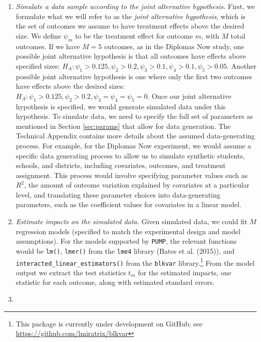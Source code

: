 \documentclass[
]{article}
\begin{document}
\begin{enumerate}
\def\labelenumi{\arabic{enumi}.}
\item
  \emph{Simulate a data sample according to the joint alternative
  hypothesis.} First, we formulate what we will refer to as the
  \emph{joint alternative hypothesis}, which is the set of outcomes we
  assume to have treatment effects above the desired size. We define
  \(\psi_m\) to be the treatment effect for outcome \(m\), with \(M\)
  total outcomes. If we have \(M = 5\) outcomes, as in the Diplomas Now
  study, one possible joint alternative hypothesis is that all outcomes
  have effects above specified sizes:
  \(H_A: \psi_1 > 0.125, \psi_2 > 0.2, \psi_3 > 0.1, \psi_4 > 0.1, \psi_5 > 0.05\).
  Another possible joint alternative hypothesis is one where only the
  first two outcomes have effects above the desired sizes:
  \(H_A: \psi_1 > 0.125, \psi_2 > 0.2, \psi_3 = \psi_4 = \psi_5 = 0\).
  Once our joint alternative hypothesis is specified, we would generate
  simulated data under this hypothesis. To simulate data, we need to
  specify the full set of parameters as mentioned in Section
  \ref{sec:params} that allow for data generation. The Technical
  Appendix contains more details about the assumed data-generating
  process. For example, for the Diplomas Now experiment, we would assume
  a specific data generating process to allow us to simulate synthetic
  students, schools, and districts, including covariates, outcomes, and
  treatment assignment. This process would involve specifying parameter
  values such as \(R^2\), the amount of outcome variation explained by
  covariates at a particular level, and translating these parameter
  choices into data-generating parameters, such as the coefficient
  values for covariates in a linear model.
\item
  \emph{Estimate impacts on the simulated data.} Given simulated data,
  we could fit \(M\) regression models (specified to match the
  experimental design and model assumptions). For the models supported
  by \texttt{PUMP}, the relevant functions would be \texttt{lm()},
  \texttt{lmer()} from the \texttt{lme4} library (Bates et al. (2015)),
  and \texttt{interacted\_linear\_estimators()} from the \texttt{blkvar}
  library.\footnote{This package is currently under development on
    GitHub; see \url{https://github.com/lmiratrix/blkvar}} From the
  model output we extract the test statistics \(t_m\) for the estimated
  impacts, one statistic for each outcome, along with estimated standard
  errors.
\item

\end{enumerate}
\end{document}
